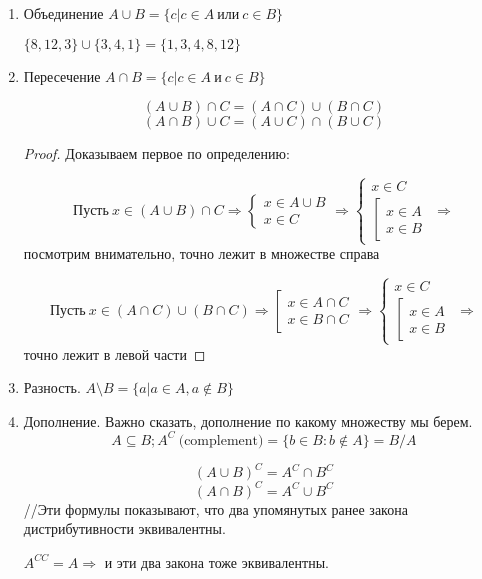 \documentclass[12pt]{report}
\begin{document}
\begin{defn}
\begin{enumerate}
\item Объединение $A \cup B = \{c | c \in A ~\mbox{или} ~c \in B\}$

$\{8, 12, 3\} \cup \{3, 4, 1\} = \{1, 3, 4, 8, 12\}$

\item Пересечение $A \cap B = \{c | c \in A ~\mbox{и} ~c \in B\}$

\begin{st}
$$(A \cup B)\cap C = (A \cap C) \cup (B \cap C)$$
$$(A \cap B)\cup C = (A \cup C) \cap (B \cup C)$$
\end{st}
\begin{proof}
Доказываем первое по определению:

$$\mbox{Пусть} ~x \in (A \cup B)\cap C \Rightarrow
\left\{
\begin{matrix}
x \in A \cup B\\
x \in C
\end{matrix}
\right. \Rightarrow
\left\{
\begin{matrix}
x \in C\\
\left[
\begin{matrix}
x \in A\\
x \in B
\end{matrix}
\right.
\end{matrix}
\right. \Rightarrow
$$
посмотрим внимательно, точно лежит в множестве справа

$$\mbox{Пусть} ~x \in (A \cap C)\cup (B\cap C) \Rightarrow
\left[
\begin{matrix}
x \in A \cap C\\
x \in B \cap C
\end{matrix}
\right. \Rightarrow
\left\{
\begin{matrix}
x \in C\\
\left[
\begin{matrix}
x \in A\\
x \in B
\end{matrix}
\right.
\end{matrix}
\right. \Rightarrow
$$
точно лежит в левой части
\end{proof}

\item Разность. $A\setminus B = \{a| a \in A, a \notin B\}$

\item Дополнение. Важно сказать, дополнение по какому множеству мы берем. $$A \subseteq B; A^C ~\mbox{(complement)}= \{b \in B: b \notin A\} = B/A$$

\begin{st}
$$(A \cup B)^C = A^C \cap B^C$$
$$(A \cap B)^C = A^C \cup B^C$$
//Эти формулы показывают, что два упомянутых ранее закона дистрибутивности эквивалентны. 


$A^{CC} = A \Rightarrow$ и эти два закона тоже эквивалентны.
\end{st}
\end{enumerate}
\end{defn}
\end{document}
